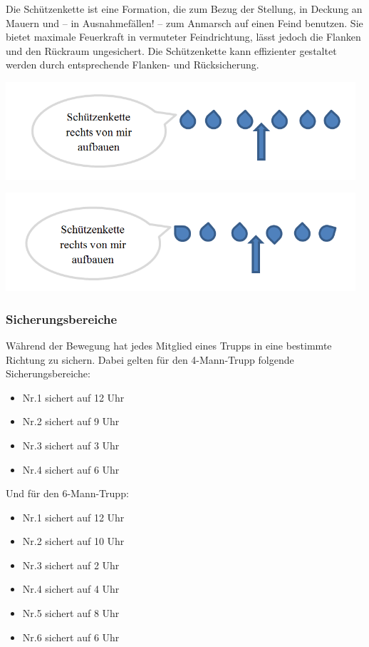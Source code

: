 	Die Schützenkette ist eine Formation, die zum Bezug der Stellung, in Deckung an Mauern und -- in Ausnahmefällen! -- zum Anmarsch auf einen Feind benutzen. Sie bietet maximale Feuerkraft in vermuteter Feindrichtung, lässt jedoch die Flanken und den Rückraum ungesichert. Die Schützenkette kann effizienter gestaltet werden durch entsprechende Flanken- und Rücksicherung.\\
		\begin{minipage}[t]{1\textwidth}
			\includegraphics[width=13cm]{./Grafiken/Abschnitt/Schuetzenkette1.png}
		\end{minipage}
		\begin{minipage}[t]{1\textwidth}
			\includegraphics[width=13cm]{./Grafiken/Abschnitt/Schuetzenkette2.png}
		\end{minipage}

\subsubsection{Sicherungsbereiche}

Während der Bewegung hat jedes Mitglied eines Trupps in eine bestimmte Richtung zu sichern. Dabei gelten für den 4-Mann-Trupp folgende Sicherungsbereiche:
	\begin{itemize}
		\item Nr.1 sichert auf 12 Uhr 
		\item Nr.2 sichert auf 9 Uhr 
		\item Nr.3 sichert auf 3 Uhr 
		\item Nr.4 sichert auf 6 Uhr 
	\end{itemize}
Und für den 6-Mann-Trupp:
	\begin{itemize}
		\item Nr.1 sichert auf 12 Uhr 
		\item Nr.2 sichert auf 10 Uhr 
		\item Nr.3 sichert auf 2 Uhr 
		\item Nr.4 sichert auf 4 Uhr 
		\item Nr.5 sichert auf 8 Uhr
		\item Nr.6 sichert auf 6 Uhr 
	\end{itemize}

